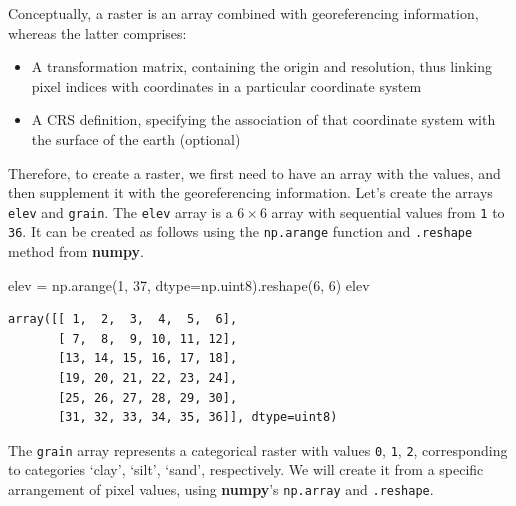 \documentclass[
  letterpaper,
]{krantz}
\newenvironment{Shaded}{\begin{snugshade}}{\end{snugshade}}
\newcommand{\DecValTok}[1]{\textcolor[rgb]{0.68,0.00,0.00}{#1}}
\newcommand{\NormalTok}[1]{\textcolor[rgb]{0.00,0.23,0.31}{#1}}
\newcommand{\OperatorTok}[1]{\textcolor[rgb]{0.37,0.37,0.37}{#1}}
\providecommand{\tightlist}{%
  \setlength{\itemsep}{0pt}\setlength{\parskip}{0pt}}\usepackage{longtable,booktabs,array}
\begin{document}
Conceptually, a raster is an array combined with georeferencing
information, whereas the latter comprises:

\begin{itemize}
\tightlist
\item
  A transformation matrix, containing the origin and resolution, thus
  linking pixel indices with coordinates in a particular coordinate
  system
\item
  A CRS definition, specifying the association of that coordinate system
  with the surface of the earth (optional)
\end{itemize}

Therefore, to create a raster, we first need to have an array with the
values, and then supplement it with the georeferencing information.
Let's create the arrays \texttt{elev} and \texttt{grain}. The
\texttt{elev} array is a \(6 \times 6\) array with sequential values
from \texttt{1} to \texttt{36}. It can be created as follows using the
\texttt{np.arange} function and \texttt{.reshape} method from
\textbf{numpy}.

\begin{Shaded}
\begin{Highlighting}[]
\NormalTok{elev }\OperatorTok{=}\NormalTok{ np.arange(}\DecValTok{1}\NormalTok{, }\DecValTok{37}\NormalTok{, dtype}\OperatorTok{=}\NormalTok{np.uint8).reshape(}\DecValTok{6}\NormalTok{, }\DecValTok{6}\NormalTok{)}
\NormalTok{elev}
\end{Highlighting}
\end{Shaded}

\begin{verbatim}
array([[ 1,  2,  3,  4,  5,  6],
       [ 7,  8,  9, 10, 11, 12],
       [13, 14, 15, 16, 17, 18],
       [19, 20, 21, 22, 23, 24],
       [25, 26, 27, 28, 29, 30],
       [31, 32, 33, 34, 35, 36]], dtype=uint8)
\end{verbatim}

The \texttt{grain} array represents a categorical raster with values
\texttt{0}, \texttt{1}, \texttt{2}, corresponding to categories `clay',
`silt', `sand', respectively. We will create it from a specific
arrangement of pixel values, using \textbf{numpy}'s \texttt{np.array}
and \texttt{.reshape}.
\end{document}
